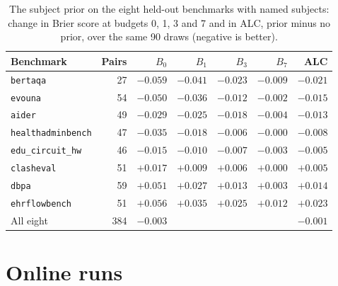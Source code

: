 \documentclass{article}
\begin{document}
\begin{table}[h]
\centering
\caption{The subject prior on the eight held-out benchmarks with named subjects: change in Brier score at budgets 0, 1, 3 and 7 and in ALC, prior minus no prior, over the same 90 draws (negative is better).}
\label{tab:heldout}
\small
\begin{tabular}{lrrrrrr}
\toprule
Benchmark & Pairs & $B_0$ & $B_1$ & $B_3$ & $B_7$ & ALC \\
\midrule
\texttt{bertaqa} & 27 & $-0.059$ & $-0.041$ & $-0.023$ & $-0.009$ & $-0.021$ \\
\texttt{evouna} & 54 & $-0.050$ & $-0.036$ & $-0.012$ & $-0.002$ & $-0.015$ \\
\texttt{aider} & 49 & $-0.029$ & $-0.025$ & $-0.018$ & $-0.004$ & $-0.013$ \\
\texttt{healthadminbench} & 47 & $-0.035$ & $-0.018$ & $-0.006$ & $-0.000$ & $-0.008$ \\
\texttt{edu\_circuit\_hw} & 46 & $-0.015$ & $-0.010$ & $-0.007$ & $-0.003$ & $-0.005$ \\
\texttt{clasheval} & 51 & $+0.017$ & $+0.009$ & $+0.006$ & $+0.000$ & $+0.005$ \\
\texttt{dbpa} & 59 & $+0.051$ & $+0.027$ & $+0.013$ & $+0.003$ & $+0.014$ \\
\texttt{ehrflowbench} & 51 & $+0.056$ & $+0.035$ & $+0.025$ & $+0.012$ & $+0.023$ \\
\midrule
All eight & 384 & $-0.003$ & & & & $-0.001$ \\
\bottomrule
\end{tabular}
\end{table}

\section{Online runs}
\label{app:runs}
\end{document}
